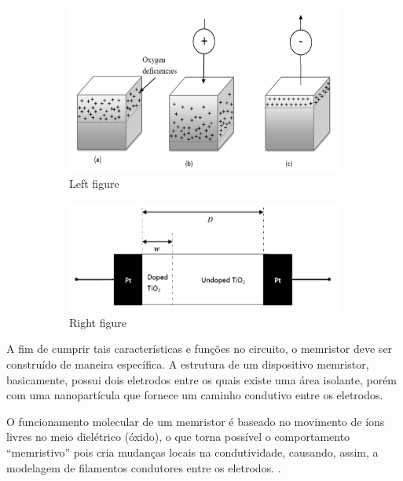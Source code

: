 \documentclass{ceel}
\begin{document}
\begin{multicols}{2}
\begin{figure}[H]
\begin{subfigure}{0.49\columnwidth}
\centering
\includegraphics[width=\columnwidth]{oxygen-vacancies}
\caption{Left figure} \label{fig:left}
\end{subfigure}
\hfill
\begin{subfigure}{0.49\columnwidth}
\centering
\includegraphics[width=\columnwidth]{HP-model}
\caption{Right figure} \label{fig:right}
\end{subfigure}

\caption{}\label{}
\end{figure}

A fim de cumprir tais características e funções no circuito, o memristor deve ser construído de maneira específica. A estrutura de um dispositivo memristor, basicamente, possui dois eletrodos entre os quais existe uma área isolante, porém com uma nanopartícula que fornece um caminho condutivo entre os eletrodos. %

O funcionamento molecular de um memristor é baseado no movimento de íons livres no meio dielétrico (óxido), o que torna possível o comportamento “memristivo” pois cria mudanças locais na condutividade, causando, assim, a modelagem de filamentos condutores entre os eletrodos. \cite{us}. %


\end{multicols}
\end{document}
